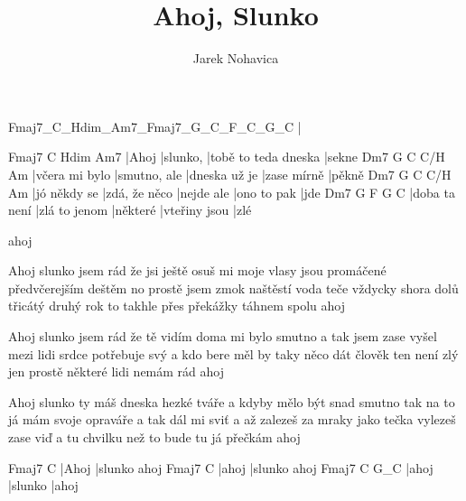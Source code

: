 \documentclass{song}
\title{Ahoj, Slunko}
\author{Jarek Nohavica}
\begin{document}
\strophe
Fmaj7_C_Hdim_Am7_Fmaj7_G_C_F_C_G_C
|
\endstrophe

\strophe
Fmaj7  C        Hdim                 Am7
|Ahoj  |slunko, |tobě to teda dneska |sekne
Dm7            G            C             C/H         Am
|včera mi bylo |smutno, ale |dneska už je |zase mírně |pěkně
Dm7          G             C          C/H         Am
|jó někdy se |zdá, že něco |nejde ale |ono to pak |jde
Dm7           G             F        G             C
|doba ta není |zlá to jenom |některé |vteřiny jsou |zlé

ahoj
\endstrophe

\strophe*
Ahoj slunko jsem rád že jsi ještě
osuš mi moje vlasy jsou promáčené předvčerejším deštěm
no prostě jsem zmok naštěstí voda teče vždycky shora dolů
třicátý druhý rok to takhle přes překážky táhnem spolu
ahoj
\endstrophe

\strophe*
Ahoj slunko jsem rád že tě vidím
doma mi bylo smutno a tak jsem zase vyšel mezi lidi
srdce potřebuje svý a kdo bere měl by taky něco dát
člověk ten není zlý jen prostě některé lidi nemám rád
ahoj
\endstrophe

\strophe*
Ahoj slunko ty máš dneska hezké tváře
a kdyby mělo být snad smutno tak na to já mám svoje opraváře
a tak dál mi sviť a až zalezeš za mraky jako tečka
vylezeš zase viď a tu chvilku než to bude tu já přečkám
ahoj
\endstrophe

\strophe
Fmaj7  C
|Ahoj  |slunko ahoj
Fmaj7  C
|ahoj  |slunko ahoj
Fmaj7  C       G_C
|ahoj  |slunko |ahoj
\endstrophe

\end{document}

